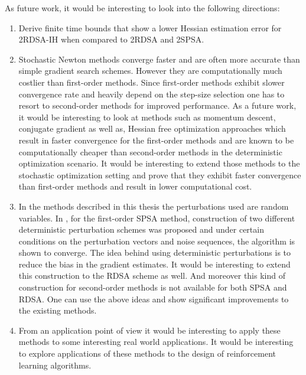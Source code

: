 As future work, it would be interesting to look into the following directions:
\begin{enumerate}
\item Derive finite time bounds that show a lower Hessian estimation error for 2RDSA-IH when compared to 2RDSA and 2SPSA. 
\item Stochastic Newton methods converge faster and  are often more accurate than simple gradient search schemes. However they are computationally much costlier than first-order methods. Since first-order methods exhibit slower convergence rate and heavily depend on the step-size selection one has to resort to second-order methods for improved performance. As a future work, it would be interesting to look at  methods such as momentum descent, conjugate gradient as well as, Hessian free optimization approaches which result in faster convergence for the first-order methods and are known to be computationally cheaper than second-order methods in the deterministic optimization scenario. It would be interesting to extend those methods to the stochastic optimization setting and prove that they exhibit  faster convergence than first-order methods and result in lower computational cost. 
\item In the methods described in this thesis the perturbations used are random variables. In \cite{bhatnagar2003two}, for the first-order SPSA method,  construction of two different deterministic  perturbation schemes was proposed and  under certain conditions on the perturbation vectors and noise sequences, the algorithm is shown to converge. The idea behind using deterministic perturbations is to reduce the bias in the gradient estimates. It would be interesting to extend this construction to the RDSA scheme as well. And moreover this kind of construction for second-order methods is not available for both SPSA and RDSA. One can use the above ideas and show significant improvements to the existing methods.
\item From an application point of view it would be interesting to apply these methods to some interesting real world applications. It would be interesting to explore applications of  these methods  to the design of reinforcement learning algorithms.
\end{enumerate}